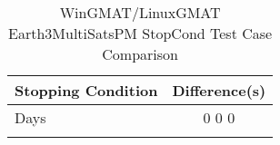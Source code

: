 \begin{table}[htbp!]
\centering
\caption{ WinGMAT/LinuxGMAT Earth3MultiSatsPM StopCond Test Case Comparison}
      \begin{tabular}{lc}
      \hline\hline
          Stopping Condition & Difference(s) \\
         \hline
         Days &  0 0 0 \\
      \hline\hline
      \label{Table: WinGMAT-LinuxGMAT Earth3MultiSatsPM StopCond Table} 
\end{tabular}
\end{table}

